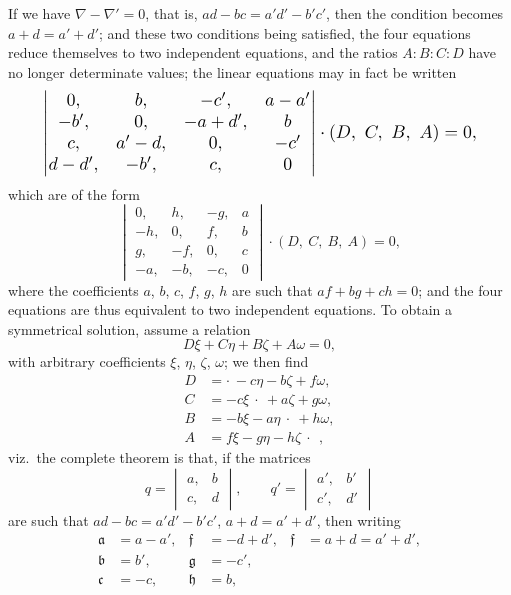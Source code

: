 \documentclass[11pt]{article}
\begin{document}
\noindent If we have $\nabla - \nabla' = 0$, that is, $ad - bc = a'd' - b'c'$, then the condition becomes $a + d = a' + d'$; and these two conditions being satisfied, the four equations reduce themselves to two independent equations, and the ratios $A : B : C : D$ have no longer determinate values; the linear equations may in fact be written
\[
\resizebox{0.9\textwidth}{!}{$\displaystyle
\begin{vmatrix} 0, & b, & -c', & a - a' \\ -b', & 0, & -a + d', & b \\ c, & a' - d, & 0, & -c' \\ d - d', & -b', & c, & 0 \end{vmatrix} \cdot (D,\ C,\ B,\ A) = 0,
$}
\]
which are of the form
\[
\begin{vmatrix} 0, & h, & -g, & a \\ -h, & 0, & f, & b \\ g, & -f, & 0, & c \\ -a, & -b, & -c, & 0 \end{vmatrix} \cdot (D,\ C,\ B,\ A) = 0,
\]
where the coefficients $a$, $b$, $c$, $f$, $g$, $h$ are such that $af + bg + ch = 0$; and the four equations are thus equivalent to two independent equations. To obtain a symmetrical solution, assume a relation
\[
D\xi + C\eta + B\zeta + A\omega = 0,
\]
with arbitrary coefficients $\xi$, $\eta$, $\zeta$, $\omega$; we then find
\begin{align*}
D &= \cdot\ -c\eta - b\zeta + f\omega, \\
C &= -c\xi\ \cdot\ + a\zeta + g\omega, \\
B &= -b\xi - a\eta\ \cdot\ + h\omega, \\
A &= f\xi - g\eta - h\zeta\ \cdot\ \ ,
\end{align*}
viz.\ the complete theorem is that, if the matrices
\[
q = \begin{vmatrix} a, & b \\ c, & d \end{vmatrix}, \qquad q' = \begin{vmatrix} a', & b' \\ c', & d' \end{vmatrix}
\]
are such that $ad - bc = a'd' - b'c'$, $a + d = a' + d'$, then writing
\begin{align*}
\mathfrak{a} &= a - a', & \mathfrak{f} &= -d + d', & \mathfrak{f} &= a + d = a' + d', \\
\mathfrak{b} &= b', & \mathfrak{g} &= -c', & & \\
\mathfrak{c} &= -c, & \mathfrak{h} &= b, & &
\end{align*}
\end{document}
